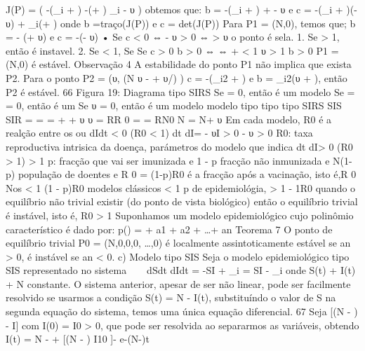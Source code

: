 {{{{{{{{{{{{{{{{{{{{{J(P) = 
( -(\beta_{i} + \gamma ) -(\betaS + \gamma ) 
\beta_{i} \betaS - υ 
) 
obtemos que: b = -(\beta_{i} + \gamma ) + \betaS - υ e c = -(\beta_{i} + \gamma )(\betaS - υ) + \beta_{i}(\betaS + \gamma ) onde b =traço(J(P)) e c = det(J(P)) 
Para P1 = (N,0), temos que; b = \betaN - (\gamma  + υ) e c = -\gamma (\betaN - υ) 
• Se c < 0 ⇔ \betaN - υ > 0 ⇔ \betaN > υ o ponto é sela. 
1. Se  > 1, então é instavel. 2. Se  < 1, 
Se Se c > 0 b > 0 ⇔ ⇔ \gamma  {} \betaN 
+ < 1 \Rightarrow  υ > 1 
b > 0 
P1 = (N,0) é estável. 
Observação 4 A estabilidade do ponto P1 não implica que exista P2. 
Para o ponto P2 = 
(υ\beta, \gamma (N υ - + υ/\beta) 
\gamma  
) 
c = -(\beta_{i}2 + \gamma ) e b = \beta_{i}2(υ + \gamma ), então P2 é estável. 
66 
Figura 19: Diagrama tipo SIRS 
Se \delta  = 0, então é um modelo Se \delta  = \gamma  = 0, então é um Se υ = 0, então é um modelo modelo tipo tipo tipo SIRS SIS \Rightarrow  SIR \Rightarrow  \sigma  \sigma  \Rightarrow  = = \sigma  \gamma  \gamma  = + \beta + \beta υ  υ = \Rightarrow  \Rightarrow  \beta\delta  RR 0 = = RN0 N =  \delta  N+ \beta \beta\delta  υ 
Em cada modelo, R0 é a realção entre os ou dIdt < 0 (R0 < 1) 
dt dI= \betaSI - υI > 0 \Rightarrow  \betaS - υ > 0 \Rightarrow  R0: taxa reproductiva intrisica da doença,  parámetros do modelo que indica dt dI> 0 (R0 > 1) 
> 1 
p: fracção que vai ser imunizada e 1 - p fracção não inmunizada e N(1-p) população de doentes e R 0 = (1-p)R0 é a fracção após a vacinação, isto é,R 0 Nos < 1 \Rightarrow  (1 - p)R0 modelos clássicos < 1 \Rightarrow  p de epidemiológia, > 1 - 1R0 quando o equilíbrio não trivial existir (do ponto de vista biológico) então o equilíbrio trivial é instável, isto é, R0 > 1 
Suponhamos um modelo epidemiológico cujo polinômio característico é dado por: 
p(\lambda) = \lambdan + a1 + a2 + \ldots + an 
Teorema 7 O ponto de equilíbrio trivial P0 = (N,0,0,0, \ldots,0) é localmente assintoticamente estável se an > 0, é instável se an < 0. 
c) Modelo tipo SIS 
Seja o modelo epidemiológico tipo SIS representado no sistema  
dSdt dIdt = -\alpha SI + \beta_{i} 
= \alpha SI - \beta_{i} 
onde S(t) + I(t) + N constante. 
O sistema anterior, apesar de ser não linear, pode ser facilmente resolvido se usarmos a condição S(t) = N - I(t), substituíndo o valor de S na segunda equação do sistema, temos uma única equação diferencial. 
67 
Seja 
[(N - \alpha \beta) 
- I] 
com I(0) = I0 > 0, que pode ser resolvida ao separarmos as variáveis, obtendo 
I(t) = \alpha N - \beta 
\alpha  + 
[(\alpha N - \beta) I10 ]- \alpha e-(\alpha N-\beta)t 
}}}}}}}}}}}}}}}}}}}}}

